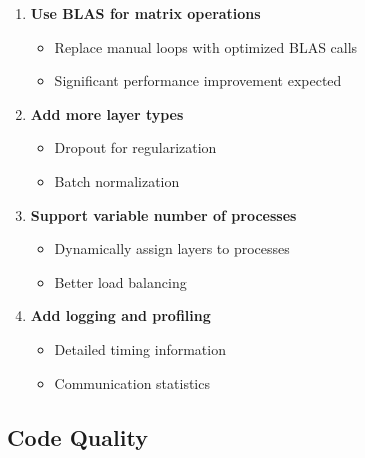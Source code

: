 \documentclass[11pt,a4paper]{article}
\begin{document}
\begin{enumerate}
    \item \textbf{Use BLAS for matrix operations}
    \begin{itemize}
        \item Replace manual loops with optimized BLAS calls
        \item Significant performance improvement expected
    \end{itemize}
    
    \item \textbf{Add more layer types}
    \begin{itemize}
        \item Dropout for regularization
        \item Batch normalization
    \end{itemize}
    
    \item \textbf{Support variable number of processes}
    \begin{itemize}
        \item Dynamically assign layers to processes
        \item Better load balancing
    \end{itemize}
    
    \item \textbf{Add logging and profiling}
    \begin{itemize}
        \item Detailed timing information
        \item Communication statistics
    \end{itemize}
\end{enumerate}

\subsection{Code Quality}
\end{document}
